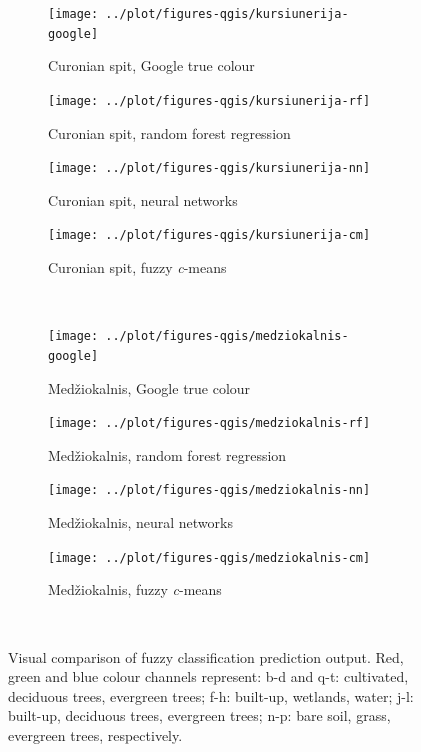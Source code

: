 \documentclass[a4paper,10pt]{book}
\begin{document}
\begin{figure}
  \ContinuedFloat
  \centering
  \begin{subfigure}[b]{.23\textwidth}
    \texttt{[image: ../plot/figures-qgis/kursiunerija-google]}
    \caption{Curonian spit, Google true colour}
  \end{subfigure} \hfill
  \begin{subfigure}[b]{.23\textwidth}
    \texttt{[image: ../plot/figures-qgis/kursiunerija-rf]}
    \caption{Curonian spit, random forest regression}
    \label{subfig-kursiunerija-rf}
  \end{subfigure} \hfill
  \begin{subfigure}[b]{.23\textwidth}
    \texttt{[image: ../plot/figures-qgis/kursiunerija-nn]}
    \caption{Curonian spit, neural networks}
  \end{subfigure} \hfill
  \begin{subfigure}[b]{.23\textwidth}
    \texttt{[image: ../plot/figures-qgis/kursiunerija-cm]}
    \caption{Curonian spit, fuzzy \textit{c}-means}
    \label{subfig-kursiunerija-cm}
  \end{subfigure} \
  \begin{subfigure}[b]{.23\textwidth}
    \texttt{[image: ../plot/figures-qgis/medziokalnis-google]}
    \caption{Med\v{z}iokalnis, Google true colour}
  \end{subfigure} \hfill
  \begin{subfigure}[b]{.23\textwidth}
    \texttt{[image: ../plot/figures-qgis/medziokalnis-rf]}
    \caption{Med\v{z}iokalnis, random forest regression}
    \label{subfig-medziokalnis-rf}
  \end{subfigure} \hfill
  \begin{subfigure}[b]{.23\textwidth}
    \texttt{[image: ../plot/figures-qgis/medziokalnis-nn]}
    \caption{Med\v{z}iokalnis, neural networks}
  \end{subfigure} \hfill
  \begin{subfigure}[b]{.23\textwidth}
    \texttt{[image: ../plot/figures-qgis/medziokalnis-cm]}
    \caption{Med\v{z}iokalnis, fuzzy \textit{c}-means}
    \label{subfig-medziokalnis-cm}
  \end{subfigure} \
  \caption{Visual comparison of fuzzy classification prediction output. Red, green and blue colour channels represent: b-d and q-t: cultivated, deciduous trees, evergreen trees; f-h: built-up, wetlands, water; j-l: built-up, deciduous trees, evergreen trees; n-p: bare soil, grass, evergreen trees, respectively.}
  \label{fig-visualcomparison}
\end{figure}
\end{document}
